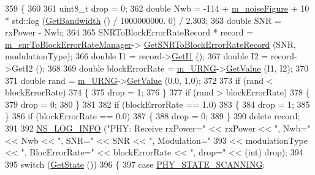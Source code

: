 \begin{DoxyCode}
359 \{
360 
361   uint8\_t drop = 0;
362   \textcolor{keywordtype}{double} Nwb = -114 + \hyperlink{classns3_1_1SimpleOfdmWimaxPhy_a6575ae6a549ba1fde4ef735ae63abf78}{m\_noiseFigure} + 10 * std::log (\hyperlink{classns3_1_1SimpleOfdmWimaxPhy_a3ca7aecb410b74cb11d9ec9c4e4a3c53}{GetBandwidth} () / 1000000000.
      0) / 2.303;
363   \textcolor{keywordtype}{double} SNR = rxPower - Nwb;
364 
365   SNRToBlockErrorRateRecord * record = \hyperlink{classns3_1_1SimpleOfdmWimaxPhy_a84b79db3c0e61c0797765a154c50c24e}{m\_snrToBlockErrorRateManager}->
      \hyperlink{classns3_1_1SNRToBlockErrorRateManager_a95032f946ee3ee4125b01654fda54fe4}{GetSNRToBlockErrorRateRecord} (SNR, modulationType);
366   \textcolor{keywordtype}{double} I1 = record->\hyperlink{classns3_1_1SNRToBlockErrorRateRecord_a2a833cbf0a6c0b7d7711b8b9e80cb374}{GetI1} ();
367   \textcolor{keywordtype}{double} I2 = record->GetI2 ();
368 
369   \textcolor{keywordtype}{double} blockErrorRate = \hyperlink{classns3_1_1SimpleOfdmWimaxPhy_a4cf477c7c9eed77333bd5833cc3ba6d3}{m\_URNG}->\hyperlink{classns3_1_1UniformRandomVariable_a03822d8c86ac51e9aa83bbc73041386b}{GetValue} (I1, I2);
370 
371   \textcolor{keywordtype}{double} rand = \hyperlink{classns3_1_1SimpleOfdmWimaxPhy_a4cf477c7c9eed77333bd5833cc3ba6d3}{m\_URNG}->\hyperlink{classns3_1_1UniformRandomVariable_a03822d8c86ac51e9aa83bbc73041386b}{GetValue} (0.0, 1.0);
372 
373   \textcolor{keywordflow}{if} (rand < blockErrorRate)
374     \{
375       drop = 1;
376     \}
377   \textcolor{keywordflow}{if} (rand > blockErrorRate)
378     \{
379       drop = 0;
380     \}
381 
382   \textcolor{keywordflow}{if} (blockErrorRate == 1.0)
383     \{
384       drop = 1;
385     \}
386   \textcolor{keywordflow}{if} (blockErrorRate == 0.0)
387     \{
388       drop = 0;
389     \}
390   \textcolor{keyword}{delete} record;
391 
392   \hyperlink{group__logging_gafbd73ee2cf9f26b319f49086d8e860fb}{NS\_LOG\_INFO} (\textcolor{stringliteral}{"PHY: Receive rxPower="} << rxPower << \textcolor{stringliteral}{", Nwb="} << Nwb << \textcolor{stringliteral}{", SNR="} << SNR << \textcolor{stringliteral}{",
       Modulation="}
393                                        << modulationType << \textcolor{stringliteral}{", BlocErrorRate="} << blockErrorRate << \textcolor{stringliteral}{",
       drop="} << (\textcolor{keywordtype}{int}) drop);
394 
395   \textcolor{keywordflow}{switch} (\hyperlink{classns3_1_1WimaxPhy_af51560fc904a23bd05355e1a75c16109}{GetState} ())
396     \{
397     \textcolor{keywordflow}{case} \hyperlink{classns3_1_1WimaxPhy_a9cc75c9e84f88fc3064bba918eee1f78aef116657e3f14f2ec95fa1c127ebc68d}{PHY\_STATE\_SCANNING}:

\end{DoxyCode}
